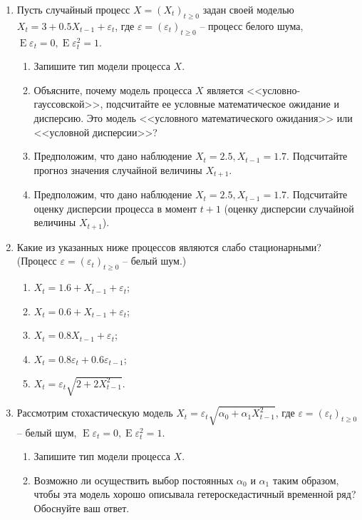 \documentclass[a4paper,12pt]{extreport}
\renewcommand{\=}[1]{\stackrel{#1}{=}} %
\newcommand{\Expect}{\mathop{{}\mathrm{E}}}
\newcommand{\generaltime}{t \geqslant 0}
\newcommand{\newprocess}[1]{
	\ensuremath{
		#1 = \left(#1 _t\right)_{\generaltime}
	}
}
\begin{document}
\begin{enumerate}
	\item Пусть случайный процесс $\newprocess{X}$ задан своей моделью 
	$X_t = 3 + 0.5 X_{t-1} + \varepsilon_t$, где $\newprocess{\varepsilon}$ -- 
	процесс белого шума, $\Expect \varepsilon_t = 0, \Expect \varepsilon^2_t = 1$.
	\begin{enumerate}
		\item Запишите тип модели процесса $X$.
		\item Объясните, почему модель процесса $X$ является
		<<условно-гауссовской>>, подсчитайте ее условные математическое 
		ожидание и дисперсию. Это модель <<условного математического ожидания>>
		или <<условной дисперсии>>?
		\item Предположим, что дано наблюдение $X_t = 2.5, X_{t-1} = 1.7$. 
		Подсчитайте прогноз значения случайной величины $X_{t+1}$.
		\item Предположим, что дано наблюдение $X_t = 2.5, X_{t-1} = 1.7$. 
		Подсчитайте оценку дисперсии процесса в момент $t+1$ 
		(оценку дисперсии случайной величины $X_{t+1}$).
	\end{enumerate}

	\item Какие из указанных ниже процессов являются слабо стационарными?
	(Процесс $\newprocess{\varepsilon}$ -- белый шум.)
	\begin{enumerate}
		\item $X_t = 1.6 + X_{t-1} + \varepsilon_t$;
		\item $X_t = 0.6 + X_{t-1} + \varepsilon_t$;
		\item $X_t = 0.8 X_{t-1} + \varepsilon_t$;
		\item $X_t = 0.8 \varepsilon_t + 0.6 \varepsilon_{t-1}$;
		\item $X_t = \varepsilon_t \sqrt{2 + 2X^2_{t-1}}$.
	\end{enumerate}

	\item Рассмотрим стохастическую модель 
	$X_t = \varepsilon_t \sqrt{\alpha_0 + \alpha_1 X^2_{t-1}}$,
	где $\newprocess{\varepsilon}$ -- 
	белый шум, $\Expect \varepsilon_t = 0, \Expect \varepsilon^2_t = 1$.
	\begin{enumerate}
		\item Запишите тип модели процесса $X$.
		\item Возможно ли осуществить выбор постоянных
		$\alpha_0$ и $\alpha_1$ таким образом, чтобы эта модель 
		хорошо описывала гетероскедастичный временной ряд? 
		Обоснуйте ваш ответ.
	\end{enumerate}


\end{enumerate}
\end{document}
